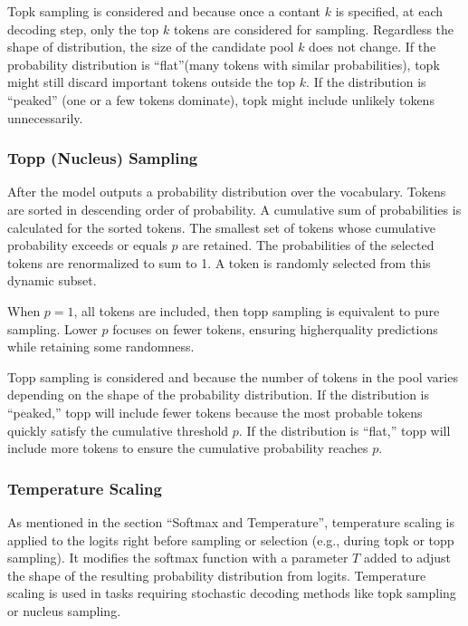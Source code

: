 \documentclass[letterpaper,11pt,english]{sphinxmanual}
\begin{document}
\sphinxAtStartPar
Top\sphinxhyphen{}k sampling is considered  and  because once
a contant \(k\) is specified, at each decoding step, only the top
\(k\) tokens are considered for sampling. Regardless the shape of
distribution, the size of the candidate pool \(k\) does not change.
If the probability distribution is “flat”(many tokens with similar
probabilities), top\sphinxhyphen{}k might still discard important tokens outside the
top \(k\). If the distribution is “peaked” (one or a few tokens
dominate), top\sphinxhyphen{}k might include unlikely tokens unnecessarily.


\subsubsection{Top\sphinxhyphen{}p (Nucleus) Sampling}
\label{\detokenize{pretraining:top-p-nucleus-sampling}}
\sphinxAtStartPar
After the model outputs a probability distribution over the vocabulary.
Tokens are sorted in descending order of probability. A cumulative sum
of probabilities is calculated for the sorted tokens. The smallest set
of tokens whose cumulative probability exceeds or equals \(p\) are
retained. The probabilities of the selected tokens are renormalized to
sum to 1. A token is randomly selected from this dynamic subset.

\sphinxAtStartPar
When \(p=1\), all tokens are included, then top\sphinxhyphen{}p sampling is
equivalent to pure sampling. Lower \(p\) focuses on fewer tokens,
ensuring higher\sphinxhyphen{}quality predictions while retaining some randomness.

\sphinxAtStartPar
Top\sphinxhyphen{}p sampling is considered  and  because the
number of tokens in the pool varies depending on the shape of the
probability distribution. If the distribution is “peaked,” top\sphinxhyphen{}p will
include fewer tokens because the most probable tokens quickly satisfy
the cumulative threshold \(p\). If the distribution is “flat,” top\sphinxhyphen{}p
will include more tokens to ensure the cumulative probability reaches
\(p\).


\subsubsection{Temperature Scaling}
\label{\detokenize{pretraining:temperature-scaling}}
\sphinxAtStartPar
As mentioned in the section “Softmax and Temperature”, temperature
scaling is applied to the logits right before sampling or selection
(e.g., during top\sphinxhyphen{}k or top\sphinxhyphen{}p sampling). It modifies the softmax function
with a parameter \(T\) added to adjust the shape of the resulting
probability distribution from logits. Temperature scaling is used in
tasks requiring stochastic decoding methods like top\sphinxhyphen{}k sampling or
nucleus sampling.
\end{document}

